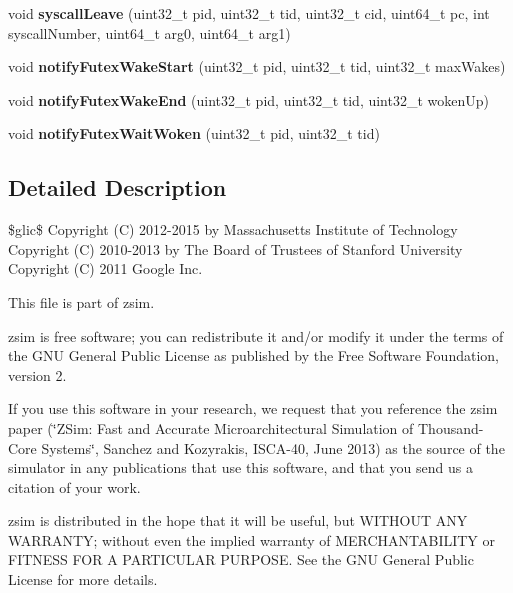 \begin{DoxyCompactItemize}
\item 
\hypertarget{classScheduler_a739d30a22b9607531ac2edd7067de6a4}{void {\bfseries syscall\-Leave} (uint32\-\_\-t pid, uint32\-\_\-t tid, uint32\-\_\-t cid, uint64\-\_\-t pc, int syscall\-Number, uint64\-\_\-t arg0, uint64\-\_\-t arg1)}\label{classScheduler_a739d30a22b9607531ac2edd7067de6a4}

\item 
\hypertarget{classScheduler_a468d55223c4d9f35dcef4560af08db02}{void {\bfseries notify\-Futex\-Wake\-Start} (uint32\-\_\-t pid, uint32\-\_\-t tid, uint32\-\_\-t max\-Wakes)}\label{classScheduler_a468d55223c4d9f35dcef4560af08db02}

\item 
\hypertarget{classScheduler_ae753f04c09271e92605bec305a9dc572}{void {\bfseries notify\-Futex\-Wake\-End} (uint32\-\_\-t pid, uint32\-\_\-t tid, uint32\-\_\-t woken\-Up)}\label{classScheduler_ae753f04c09271e92605bec305a9dc572}

\item 
\hypertarget{classScheduler_a3c95a5d0c8b40e411bbe95f249dfaafc}{void {\bfseries notify\-Futex\-Wait\-Woken} (uint32\-\_\-t pid, uint32\-\_\-t tid)}\label{classScheduler_a3c95a5d0c8b40e411bbe95f249dfaafc}

\end{DoxyCompactItemize}


\subsection{Detailed Description}
\$glic\$ Copyright (C) 2012-\/2015 by Massachusetts Institute of Technology Copyright (C) 2010-\/2013 by The Board of Trustees of Stanford University Copyright (C) 2011 Google Inc.

This file is part of zsim.

zsim is free software; you can redistribute it and/or modify it under the terms of the G\-N\-U General Public License as published by the Free Software Foundation, version 2.

If you use this software in your research, we request that you reference the zsim paper (\char`\"{}\-Z\-Sim\-: Fast and Accurate Microarchitectural Simulation of
\-Thousand-\/\-Core Systems\char`\"{}, Sanchez and Kozyrakis, I\-S\-C\-A-\/40, June 2013) as the source of the simulator in any publications that use this software, and that you send us a citation of your work.

zsim is distributed in the hope that it will be useful, but W\-I\-T\-H\-O\-U\-T A\-N\-Y W\-A\-R\-R\-A\-N\-T\-Y; without even the implied warranty of M\-E\-R\-C\-H\-A\-N\-T\-A\-B\-I\-L\-I\-T\-Y or F\-I\-T\-N\-E\-S\-S F\-O\-R A P\-A\-R\-T\-I\-C\-U\-L\-A\-R P\-U\-R\-P\-O\-S\-E. See the G\-N\-U General Public License for more details.

